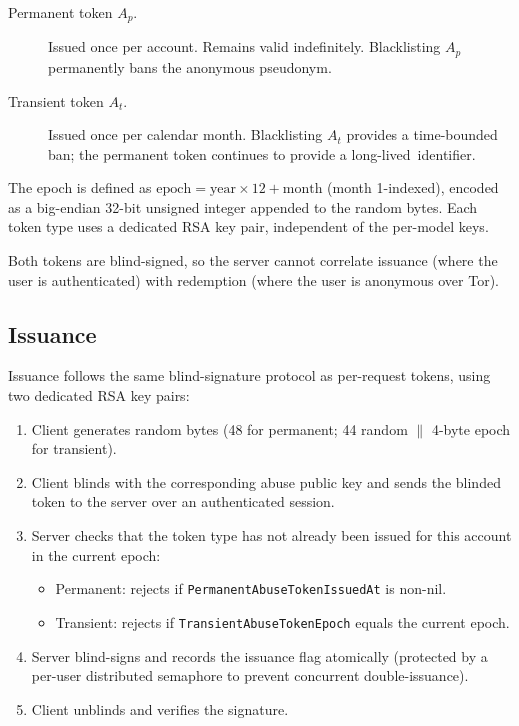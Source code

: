 \documentclass[11pt,a4paper]{article}
\begin{document}
\begin{description}
  \item[Permanent token $A_p$.]  Issued once per account. Remains valid indefinitely. Blacklisting
    $A_p$ permanently bans the anonymous pseudonym.
  \item[Transient token $A_t$.]  Issued once per calendar month. Blacklisting $A_t$ provides a
    time-bounded ban; the permanent token continues to provide a long-lived~identifier.
\end{description}

The epoch is defined as $\text{epoch} = \text{year} \times 12 + \text{month}$ (month 1-indexed), encoded
as a big-endian 32-bit unsigned integer appended to the random bytes. Each token type uses a dedicated
RSA key pair, independent of the per-model keys.

Both tokens are blind-signed, so the server cannot correlate issuance (where the user is authenticated)
with redemption (where the user is anonymous over Tor).

\subsection{Issuance}
\label{sec:abuse:issuance}

Issuance follows the same blind-signature protocol as per-request tokens, using two dedicated RSA key
pairs:

\begin{enumerate}
  \item Client generates random bytes (48 for permanent; 44 random $\|$ 4-byte epoch for transient).
  \item Client blinds with the corresponding abuse public key and sends the blinded token to the server
        over an authenticated session.
  \item Server checks that the token type has not already been issued for this account in the current
        epoch:
        \begin{itemize}
          \item Permanent: rejects if \texttt{PermanentAbuseTokenIssuedAt} is non-nil.
          \item Transient: rejects if \texttt{TransientAbuseTokenEpoch} equals the current epoch.
        \end{itemize}
  \item Server blind-signs and records the issuance flag atomically (protected by a per-user distributed
        semaphore to prevent concurrent double-issuance).
  \item Client unblinds and verifies the signature.
\end{enumerate}
\end{document}
